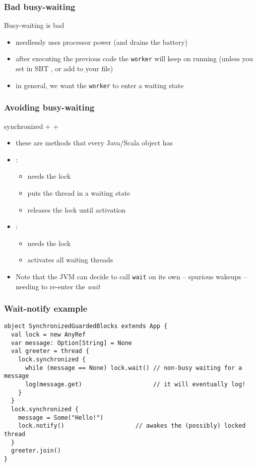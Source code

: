 \documentclass[aspectratio=169]{beamer}
\begin{document}
\begin{frame}\frametitle{Bad busy-waiting}
    
  \begin{block}{Busy-waiting is bad}
    \begin{itemize}
      \item needlessly uses processor power (and drains the battery)
      \item after executing the previous code the \texttt{worker} will keep on running (unless you set in SBT , or add  to your  file)
      \item in general, we want the \texttt{worker} to enter a waiting state
    \end{itemize}
    
  \end{block}
\end{frame}

\begin{frame}\frametitle{Avoiding busy-waiting}
\centering

{\Large \alert{synchronized} +  + }

\begin{itemize}
  \item these are methods that every Java/Scala object has
  \item {}:
    \begin{itemize}
      \item needs the lock
      \item puts the thread in a \alert{waiting} state
      \item releases the lock until activation
    \end{itemize}
  \item {}:
    \begin{itemize}
      \item needs the lock
      \item \alert{activates} all waiting threads
    \end{itemize}
  \pause
  \item Note that the JVM can decide to call \texttt{wait} on its own -- \alert{spurious wakeups} -- needing to re-enter the \emph{wait}
\end{itemize}
\end{frame}

\begin{frame}[fragile]\frametitle{Wait-notify example}
\begin{lstlisting}[emph={sleep,log,thread,join,wait,notify,synchronized}]
object SynchronizedGuardedBlocks extends App {
  val lock = new AnyRef
  var message: Option[String] = None
  val greeter = thread {
    lock.synchronized {
      while (message == None) lock.wait() // non-busy waiting for a message
      log(message.get)                    // it will eventually log!
    }
  }
  lock.synchronized {
    message = Some("Hello!")
    lock.notify()                    // awakes the (possibly) locked thread
  }
  greeter.join()
}
\end{lstlisting}
\end{frame}
\end{document}
